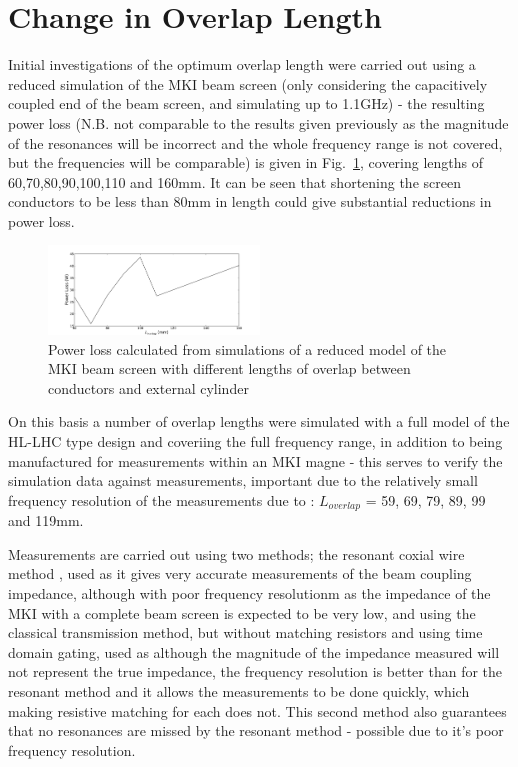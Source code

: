 \documentclass[a4paper,
              ]{jacow}
\begin{document}
\section{Change in Overlap Length}

Initial investigations of the optimum overlap length were carried out using a reduced simulation of the MKI beam screen (only considering the capacitively coupled end of the beam screen, and simulating up to 1.1GHz) - the resulting power loss (N.B. not comparable to the results given previously as the magnitude of the resonances will be incorrect and the whole frequency range is not covered, but the frequencies will be comparable) is given in Fig.~\ref{fig:powLossLowRes}, covering lengths of 60,70,80,90,100,110 and 160mm. It can be seen that shortening the screen conductors to be less than 80mm in length could give substantial reductions in power loss.

\begin{figure}
\begin{center}
\includegraphics[width=0.5\textwidth]{powLossLowRes.pdf}
\caption{Power loss calculated from simulations of a reduced model of the MKI beam screen with different lengths of overlap between conductors and external cylinder}
\label{fig:powLossLowRes}
\end{center}
\end{figure}

On this basis a number of overlap lengths were simulated with a full model of the HL-LHC type design and coveriing the full frequency range, in addition to being manufactured for measurements within an MKI magne - this serves to verify the simulation data against measurements, important due to the relatively small frequency resolution of the measurements due to : $L_{overlap}$ = 59, 69, 79, 89, 99 and 119mm. 

Measurements are carried out using two methods; the resonant coxial wire method \cite{DayThesis}, used as it gives very accurate measurements of the beam coupling impedance, although with poor frequency resolutionm as the impedance of the MKI with a complete beam screen is expected to be very low, and using the classical transmission method, but without matching resistors and using time domain gating, used as although the magnitude of the impedance measured will not represent the true impedance, the frequency resolution is better than for the resonant method and it allows the measurements to be done quickly, which making resistive matching for each does not. This second method also guarantees that no resonances are missed by the resonant method - possible due to it's poor frequency resolution.
\end{document}
